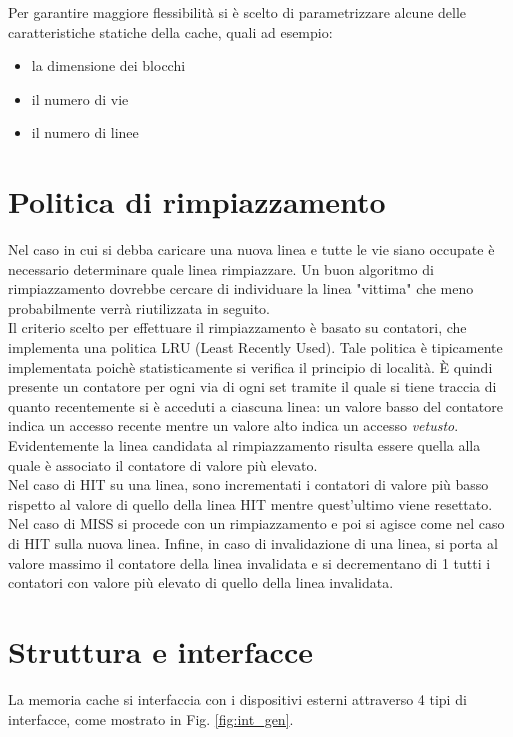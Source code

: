 Per garantire maggiore flessibilit\`a si \`e scelto di parametrizzare alcune delle caratteristiche statiche della cache, quali ad esempio:
\begin{itemize}
\item la dimensione dei blocchi
\item il numero di vie
\item il numero di linee
\end{itemize}


\section{Politica di rimpiazzamento}

Nel caso in cui si debba caricare una nuova linea e tutte le vie siano occupate \`e necessario determinare quale linea rimpiazzare.
Un buon algoritmo di rimpiazzamento dovrebbe cercare di individuare la linea "vittima" che meno probabilmente verr\`a riutilizzata in seguito.\\
Il criterio scelto per effettuare il rimpiazzamento \`e basato su contatori, che implementa una politica LRU (Least Recently Used).
Tale politica \`e tipicamente implementata poich\`e statisticamente si verifica il principio di localit\`a.
\`E quindi presente un contatore per ogni via di ogni set tramite il quale si tiene traccia di quanto recentemente si \`e acceduti a ciascuna linea: un valore basso del contatore indica un accesso recente mentre un valore alto indica un accesso \emph{vetusto}.
Evidentemente la linea candidata al rimpiazzamento risulta essere quella alla quale \`e associato il contatore di valore pi\`u elevato.\\
Nel caso di HIT su una linea, sono incrementati i contatori di valore pi\`u basso rispetto al valore di quello della linea HIT mentre quest'ultimo viene resettato.
Nel caso di MISS si procede con un rimpiazzamento e poi si agisce come nel caso di HIT sulla nuova linea.
Infine, in caso di invalidazione di una linea, si porta al valore massimo il contatore della linea invalidata e si decrementano di 1 tutti i contatori con valore pi\`u elevato di quello della linea invalidata.


\section{Struttura e interfacce}
La memoria cache si interfaccia con i dispositivi esterni attraverso 4 tipi di interfacce, come mostrato in Fig. \ref{fig:int_gen}.\\

